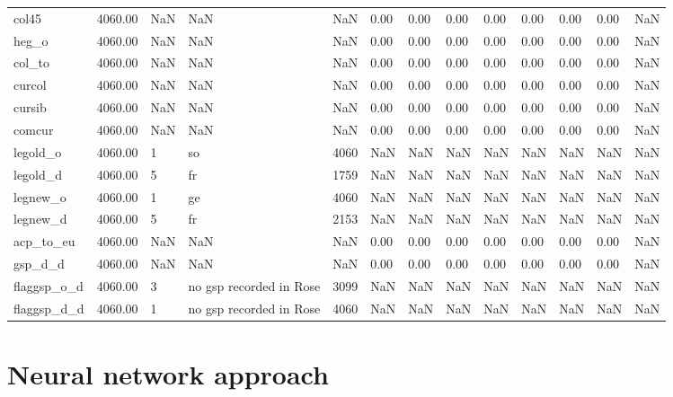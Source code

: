 \documentclass{Trade_template}
\numberwithin{equation}{section}
\begin{document}
\begin{table}
{\begin{tabularx}{\textwidth}{@{} L *{12}{Y}  @{}}
col45 & 4060.00 & NaN & NaN & NaN & 0.00 & 0.00 & 0.00 & 0.00 & 0.00 & 0.00 & 0.00 & NaN \\
heg\_o & 4060.00 & NaN & NaN & NaN & 0.00 & 0.00 & 0.00 & 0.00 & 0.00 & 0.00 & 0.00 & NaN \\
col\_to & 4060.00 & NaN & NaN & NaN & 0.00 & 0.00 & 0.00 & 0.00 & 0.00 & 0.00 & 0.00 & NaN \\
curcol & 4060.00 & NaN & NaN & NaN & 0.00 & 0.00 & 0.00 & 0.00 & 0.00 & 0.00 & 0.00 & NaN \\
cursib & 4060.00 & NaN & NaN & NaN & 0.00 & 0.00 & 0.00 & 0.00 & 0.00 & 0.00 & 0.00 & NaN \\
comcur & 4060.00 & NaN & NaN & NaN & 0.00 & 0.00 & 0.00 & 0.00 & 0.00 & 0.00 & 0.00 & NaN \\
legold\_o & 4060.00 & 1 & so & 4060 & NaN & NaN & NaN & NaN & NaN & NaN & NaN & NaN \\
legold\_d & 4060.00 & 5 & fr & 1759 & NaN & NaN & NaN & NaN & NaN & NaN & NaN & NaN \\
legnew\_o & 4060.00 & 1 & ge & 4060 & NaN & NaN & NaN & NaN & NaN & NaN & NaN & NaN \\
legnew\_d & 4060.00 & 5 & fr & 2153 & NaN & NaN & NaN & NaN & NaN & NaN & NaN & NaN \\
acp\_to\_eu & 4060.00 & NaN & NaN & NaN & 0.00 & 0.00 & 0.00 & 0.00 & 0.00 & 0.00 & 0.00 & NaN \\
gsp\_d\_d & 4060.00 & NaN & NaN & NaN & 0.00 & 0.00 & 0.00 & 0.00 & 0.00 & 0.00 & 0.00 & NaN \\
flaggsp\_o\_d & 4060.00 & 3 & no gsp recorded in Rose & 3099 & NaN & NaN & NaN & NaN & NaN & NaN & NaN & NaN \\
flaggsp\_d\_d & 4060.00 & 1 & no gsp recorded in Rose & 4060 & NaN & NaN & NaN & NaN & NaN & NaN & NaN & NaN \\ \bottomrule
\end{tabularx}}
\end{table}

\chapter{Neural network approach}
\end{document}
